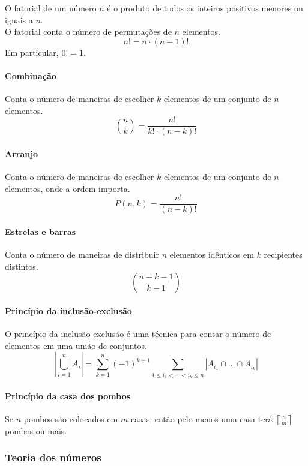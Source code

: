 O fatorial de um número $n$ é o produto de todos os inteiros positivos menores ou iguais a $n$.\\
O fatorial conta o número de permutações de $n$ elementos.
\[
n! = n \cdot (n - 1)!
\]
Em particular, $0! = 1$.

\paragraph{Combinação}

Conta o número de maneiras de escolher $k$ elementos de um conjunto de $n$ elementos.
\[
\binom{n}{k} = \frac{n!}{k! \cdot (n - k)!}
\]

\paragraph{Arranjo}

Conta o número de maneiras de escolher $k$ elementos de um conjunto de $n$ elementos, onde a ordem importa.
\[
P(n, k) = \frac{n!}{(n - k)!}
\]

\paragraph{Estrelas e barras}

Conta o número de maneiras de distribuir $n$ elementos idênticos em $k$ recipientes distintos.
\[
\binom{n + k - 1}{k - 1}
\]

\paragraph{Princípio da inclusão-exclusão}

O princípio da inclusão-exclusão é uma técnica para contar o número de elementos em uma união de conjuntos.
\[
\left| \bigcup_{i=1}^n A_i \right| = \sum_{k=1}^n (-1)^{k+1} \sum_{1 \le i_1 < \dots < i_k \le n} |A_{i_1} \cap \dots \cap A_{i_k}|
\]

\paragraph{Princípio da casa dos pombos}

Se $n$ pombos são colocados em $m$ casas, então pelo menos uma casa terá $\left\lceil \frac{n}{m} \right\rceil$ pombos ou mais.

\subsubsection{Teoria dos números}

